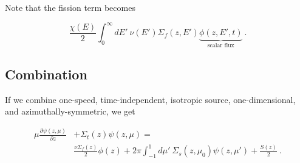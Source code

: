 \documentclass[12pt]{article}
\begin{document}
Note that the fission term becomes

\[\frac{\chi(E)}{2} \int_0^{\infty} dE'\:
\nu(E')\Sigma_f(z,E')\underbrace{\phi(z, E', t)}_{\text{scalar flux}}\:. \]

\subsection*{Combination}

If we combine one-speed, time-independent, isotropic source, one-dimensional,
and azimuthally-symmetric, we get

\begin{align*}
\mu \frac{\partial \psi(z, \mu)}{\partial z} &+
\Sigma_t(z)\psi(z, \mu) = \\
&\frac{\nu\Sigma_f(z) }{2}\phi(z) + 2\pi\int_{-1}^1 d\mu'\:
\Sigma_s(z, \mu_0)\psi(z, \mu')  + \frac{S(z)}{2} \:.
\end{align*}
\end{document}
